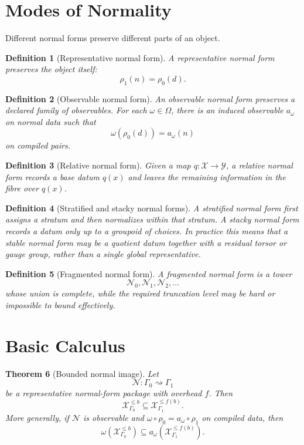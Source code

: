 \documentclass[11pt]{article}
\newtheorem{theorem}{Theorem}[section]
\newtheorem{definition}[theorem]{Definition}
\begin{document}
\section{Modes of Normality}

Different normal forms preserve different parts of an object.

\begin{definition}[Representative normal form]
A representative normal form preserves the object itself:
\[
\rho_1(n)=\rho_0(d).
\]
\end{definition}

\begin{definition}[Observable normal form]
An observable normal form preserves a declared family of observables. For each \(\omega\in\Omega\), there is an induced observable \(a_\omega\) on normal data such that
\[
\omega(\rho_0(d))=a_\omega(n)
\]
on compiled pairs.
\end{definition}

\begin{definition}[Relative normal form]
Given a map \(q:\mathcal X\to\mathcal Y\), a relative normal form records a base datum \(q(x)\) and leaves the remaining information in the fibre over \(q(x)\).
\end{definition}

\begin{definition}[Stratified and stacky normal forms]
A stratified normal form first assigns a stratum and then normalizes within that stratum. A stacky normal form records a datum only up to a groupoid of choices. In practice this means that a stable normal form may be a quotient datum together with a residual torsor or gauge group, rather than a single global representative.
\end{definition}

\begin{definition}[Fragmented normal form]
A fragmented normal form is a tower
\[
\mathcal N_0,\mathcal N_1,\mathcal N_2,\ldots
\]
whose union is complete, while the required truncation level may be hard or impossible to bound effectively.
\end{definition}

\section{Basic Calculus}

\begin{theorem}[Bounded normal image]
Let
\[
\mathcal N:\Gamma_0\rightsquigarrow\Gamma_1
\]
be a representative normal-form package with overhead \(f\). Then
\[
\mathcal X_{\Gamma_0}^{\leq b}
\subseteq
\mathcal X_{\Gamma_1}^{\leq f(b)}.
\]
More generally, if \(\mathcal N\) is observable and \(\omega\circ\rho_0=a_\omega\circ\rho_1\) on compiled data, then
\[
\omega(\mathcal X_{\Gamma_0}^{\leq b})
\subseteq
a_\omega(\mathcal X_{\Gamma_1}^{\leq f(b)}).
\]
\end{theorem}
\end{document}
